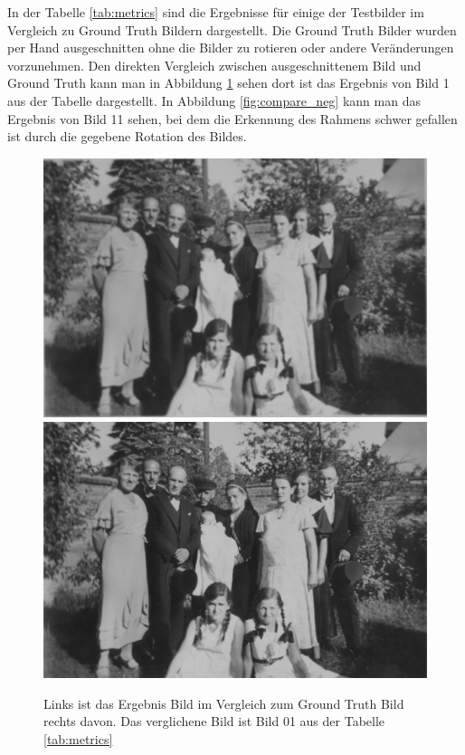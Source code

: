 In der Tabelle \ref{tab:metrics} sind die Ergebnisse für einige der Testbilder im Vergleich zu Ground Truth Bildern dargestellt. Die Ground Truth Bilder wurden per Hand ausgeschnitten ohne die Bilder zu rotieren oder andere Veränderungen vorzunehmen. 
Den direkten Vergleich zwischen ausgeschnittenem Bild und Ground Truth kann man in Abbildung \ref{fig:compare_pos} sehen dort ist das Ergebnis von Bild 1 aus der Tabelle dargestellt. In Abbildung \ref{fig:compare_neg} kann man das Ergebnis von Bild 11 sehen, bei dem die Erkennung des Rahmens schwer gefallen ist durch die gegebene Rotation des Bildes. 

\begin{figure}[h]
 	\centering
	\includegraphics[width=0.4\linewidth]{images/compare/01_0.png} \quad
	\includegraphics[width=0.4\linewidth]{images/compare/gt_01_0.png}
	\caption{Links ist das Ergebnis Bild im Vergleich zum Ground Truth Bild rechts davon. Das verglichene Bild ist Bild 01 aus der Tabelle \ref{tab:metrics}}
	\label{fig:compare_pos}
\end{figure}

